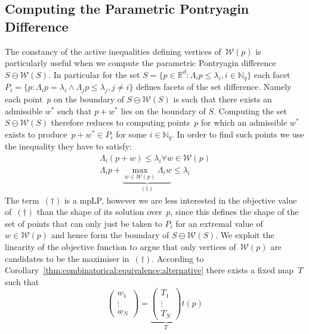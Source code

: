 \documentclass[smallextended]{svjour3}       %
\numberwithin{equation}{section}
\begin{document}
\subsection{Computing the Parametric Pontryagin Difference}\label{ssec:computation:p:pontryagin:difference}
%
%
%
The constancy of the active inequalities defining vertices of~$\mathcal W(p)$ is particularly useful when we compute the parametric Pontryagin difference $S\ominus\mathcal W(S)$.
%
In particular for the set $S=\{p\in\mathbb R^d:\Lambda_i p\leq\lambda_i,i\in\mathbb N_q\}$ each facet $P_i=\{p:\Lambda_i p=\lambda_i\wedge\Lambda_j p\leq\lambda_j,j\neq i\}$ defines facets of the set difference.
%
Namely each point~$p$ on the boundary of $S\ominus\mathcal W(S)$ is such that there exists an admissible $w^\ast$ such that $p+w^\ast$ lies on the boundary of $S$.
%
Computing the set $S\ominus\mathcal W(S)$ therefore reduces to computing points~$p$ for which an admissible $w^\ast$ exists to produce~$p+w^\ast\in P_i$ for some $i\in\mathbb N_q$.
%
In order to find such points we use the inequality they have to satisfy:
%
\begin{equation}\begin{split}
  \Lambda_i(p+w)\leq\lambda_i\forall w\in\mathcal W(p)\\
  \Lambda_i p+\underbrace{\max_{w\in\mathcal W(p)}\Lambda_i w}_{(\dagger)}\leq\lambda_i
\end{split}\end{equation}
%
The term~$(\dagger)$ is a mpLP, however we are less interested in the
objective value of~$(\dagger)$ than the shape of its solution
over~$p$, since this defines the shape of the set of points 
that can only just be taken to $P_i$ for an extremal value of $w\in\mathcal W(p)$ and hence form the boundary of $S\ominus \mathcal W(S)$.
%
We exploit the linearity of the objective function to argue that only vertices of~$\mathcal W(p)$ are candidates to be the maximiser in~$(\dagger)$.
%
According to Corollary~\ref{thm:combinatorical:equivalence:alternative} there exists a fixed map~$T$ such that 
%
\begin{equation}
  \begin{pmatrix}w_1\\ \vdots\\ w_N\end{pmatrix} = \underbrace{\begin{pmatrix}T_1\\ \vdots\\ T_N\end{pmatrix}}_T t(p)
\end{equation}
\end{document}
